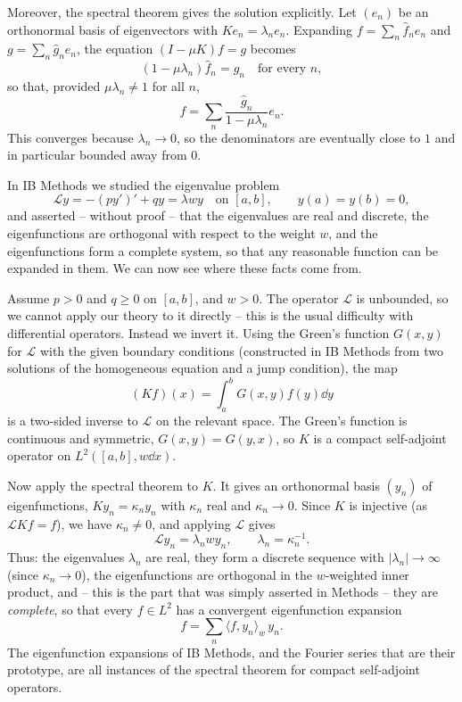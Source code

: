 \documentclass[a4paper]{scrartcl}
\newcommand{\ip}[2]{\langle #1, #2 \rangle}
\begin{document}
Moreover, the spectral theorem gives the solution explicitly. Let $(e_n)$ be an orthonormal basis of eigenvectors with $Ke_n = \lambda_ne_n$. Expanding $f = \sum_n \hat f_ne_n$ and $g = \sum_n\hat g_ne_n$, the equation $(I-\mu K)f = g$ becomes
$$(1-\mu\lambda_n)\hat f_n = \hat g_n \quad \text{for every } n,$$
so that, provided $\mu\lambda_n\neq1$ for all $n$,
$$f = \sum_n \frac{\hat g_n}{1 - \mu\lambda_n}e_n.$$
This converges because $\lambda_n\to0$, so the denominators are eventually close to $1$ and in particular bounded away from $0$.

\begin{example}
	In IB Methods we studied the eigenvalue problem
	$$\mathcal{L}y = -(py')' + qy = \lambda w y \quad \text{on } [a,b], \qquad y(a)=y(b)=0,$$
	and asserted -- without proof -- that the eigenvalues are real and discrete, the eigenfunctions are orthogonal with respect to the weight $w$, and the eigenfunctions form a complete system, so that any reasonable function can be expanded in them. We can now see where these facts come from.

	Assume $p > 0$ and $q \geq 0$ on $[a,b]$, and $w>0$. The operator $\mathcal{L}$ is unbounded, so we cannot apply our theory to it directly -- this is the usual difficulty with differential operators. Instead we invert it. Using the Green's function $G(x,y)$ for $\mathcal{L}$ with the given boundary conditions (constructed in IB Methods from two solutions of the homogeneous equation and a jump condition), the map
	$$(Kf)(x) = \int_a^b G(x,y)f(y)\dd y$$
	is a two-sided inverse to $\mathcal{L}$ on the relevant space. The Green's function is continuous and symmetric, $G(x,y)=G(y,x)$, so $K$ is a compact self-adjoint operator on $L^2([a,b], w\dd x)$.

	Now apply the spectral theorem to $K$. It gives an orthonormal basis $(y_n)$ of eigenfunctions, $Ky_n = \kappa_ny_n$ with $\kappa_n$ real and $\kappa_n \to 0$. Since $K$ is injective (as $\mathcal{L}Kf = f$), we have $\kappa_n \neq 0$, and applying $\mathcal{L}$ gives
	$$\mathcal{L}y_n = \lambda_n w y_n, \qquad \lambda_n = \kappa_n^{-1}.$$
	Thus: the eigenvalues $\lambda_n$ are real, they form a discrete sequence with $|\lambda_n| \to \infty$ (since $\kappa_n\to0$), the eigenfunctions are orthogonal in the $w$-weighted inner product, and -- this is the part that was simply asserted in Methods -- they are \emph{complete}, so that every $f\in L^2$ has a convergent eigenfunction expansion
	$$f = \sum_n \ip{f}{y_n}_w\, y_n.$$
	The eigenfunction expansions of IB Methods, and the Fourier series that are their prototype, are all instances of the spectral theorem for compact self-adjoint operators.
\end{example}
\end{document}
